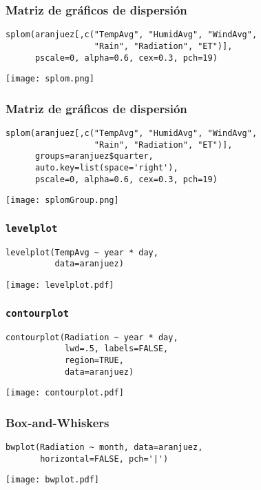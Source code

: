 \documentclass[xcolor={usenames,svgnames,dvipsnames}]{beamer}
\begin{document}
\begin{frame}[fragile]
\frametitle{Matriz de gráficos de dispersión}
\label{sec-2-1-15}


\lstset{language=R}
\begin{lstlisting}
splom(aranjuez[,c("TempAvg", "HumidAvg", "WindAvg",
                  "Rain", "Radiation", "ET")],
      pscale=0, alpha=0.6, cex=0.3, pch=19)
\end{lstlisting}

\texttt{[image: splom.png]}
\end{frame}
\begin{frame}[fragile]
\frametitle{Matriz de gráficos de dispersión}
\label{sec-2-1-16}


\lstset{language=R}
\begin{lstlisting}
splom(aranjuez[,c("TempAvg", "HumidAvg", "WindAvg",
                  "Rain", "Radiation", "ET")],
      groups=aranjuez$quarter,
      auto.key=list(space='right'),
      pscale=0, alpha=0.6, cex=0.3, pch=19)
\end{lstlisting}

\texttt{[image: splomGroup.png]}
\end{frame}
\begin{frame}[fragile]
\frametitle{\texttt{levelplot}}
\label{sec-2-1-17}


\lstset{language=R}
\begin{lstlisting}
levelplot(TempAvg ~ year * day,
          data=aranjuez)
\end{lstlisting}

\texttt{[image: levelplot.pdf]}
\end{frame}
\begin{frame}[fragile]
\frametitle{\texttt{contourplot}}
\label{sec-2-1-18}


\lstset{language=R}
\begin{lstlisting}
contourplot(Radiation ~ year * day,
            lwd=.5, labels=FALSE,
            region=TRUE, 
            data=aranjuez)
\end{lstlisting}

\texttt{[image: contourplot.pdf]}
\end{frame}
\begin{frame}[fragile]
\frametitle{Box-and-Whiskers}
\label{sec-2-1-19}


\lstset{language=R}
\begin{lstlisting}
bwplot(Radiation ~ month, data=aranjuez,
       horizontal=FALSE, pch='|')
\end{lstlisting}

\texttt{[image: bwplot.pdf]}
\end{frame}
\end{document}

